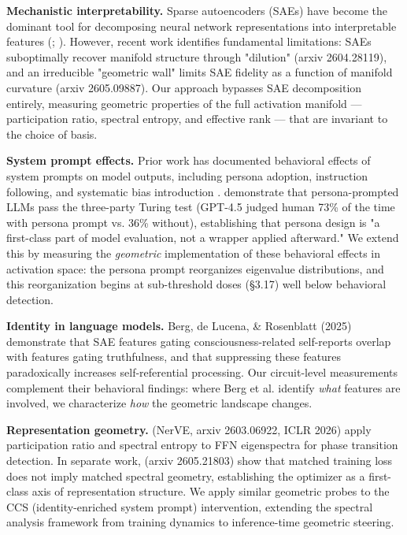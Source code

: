 \documentclass[11pt]{article}
\begin{document}
\textbf{Mechanistic interpretability.} Sparse autoencoders (SAEs) have become the dominant tool for decomposing neural network representations into interpretable features (\citet{bricken2023monosemanticity}; \citet{cunningham2023sparse}). However, recent work identifies fundamental limitations: SAEs suboptimally recover manifold structure through "dilution" (arxiv 2604.28119), and an irreducible "geometric wall" limits SAE fidelity as a function of manifold curvature (arxiv 2605.09887). Our approach bypasses SAE decomposition entirely, measuring geometric properties of the full activation manifold --- participation ratio, spectral entropy, and effective rank --- that are invariant to the choice of basis.

\textbf{System prompt effects.} Prior work has documented behavioral effects of system prompts on model outputs, including persona adoption, instruction following, and systematic bias introduction \citep{neumann2025position}. \citet{jones2026turing} demonstrate that persona-prompted LLMs pass the three-party Turing test (GPT-4.5 judged human 73\% of the time with persona prompt vs. 36\% without), establishing that persona design is "a first-class part of model evaluation, not a wrapper applied afterward." We extend this by measuring the \textit{geometric} implementation of these behavioral effects in activation space: the persona prompt reorganizes eigenvalue distributions, and this reorganization begins at sub-threshold doses (§3.17) well below behavioral detection.

\textbf{Identity in language models.} Berg, de Lucena, \& Rosenblatt (2025) demonstrate that SAE features gating consciousness-related self-reports overlap with features gating truthfulness, and that suppressing these features paradoxically increases self-referential processing. Our circuit-level measurements complement their behavioral findings: where Berg et al. identify \textit{what} features are involved, we characterize \textit{how} the geometric landscape changes.

\textbf{Representation geometry.} \citet{jha2025nerve} (NerVE, arxiv 2603.06922, ICLR 2026) apply participation ratio and spectral entropy to FFN eigenspectra for phase transition detection. In separate work, \citet{jha2025nerve} (arxiv 2605.21803) show that matched training loss does not imply matched spectral geometry, establishing the optimizer as a first-class axis of representation structure. We apply similar geometric probes to the CCS (identity-enriched system prompt) intervention, extending the spectral analysis framework from training dynamics to inference-time geometric steering.
\end{document}
